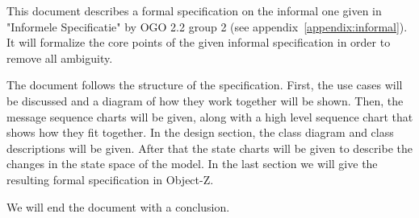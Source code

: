 This document describes a formal specification on the informal one given in "Informele Specificatie" by OGO 2.2 group 2 (see appendix~\ref{appendix:informal}).
It will formalize the core points of the given informal specification in order to remove all ambiguity.

The document follows the structure of the specification. First, the use cases will be discussed and a diagram of how they work together will be shown. Then, the message sequence charts will be given, along with a high level sequence chart that shows how they fit together. In the design section, the class diagram and class descriptions will be given. After that the state charts will be given to describe the changes in the state space of the model. In the last section we will give the resulting formal specification in Object-Z.

We will end the document with a conclusion.
